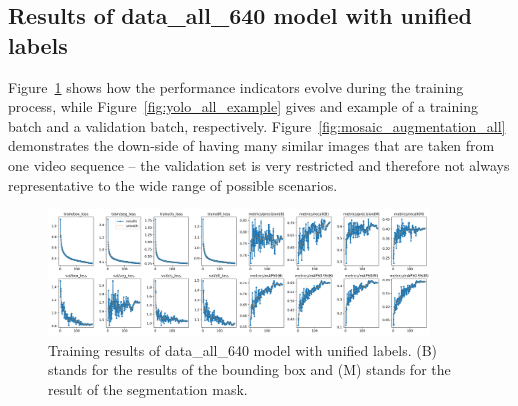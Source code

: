 \documentclass[Master,MDS,english]{BASE/twbook} %
\begin{document}
\subsection{Results of data\_all\_640 model with unified labels}

Figure~\ref{fig:training_all} shows how the performance indicators evolve during the training process, while Figure~\ref{fig:yolo_all_example} gives and example of a training batch and a validation batch, respectively.
Figure~\ref{fig:mosaic_augmentation_all} demonstrates the down-side of having many similar images that are taken from one video sequence -- the validation set is very restricted and therefore not always representative to the wide range of possible scenarios.


\begin{figure}[h]
\centering
\includegraphics[width=0.9\textwidth]{images/yolo/all/results}
\caption{Training results of data\_all\_640 model with unified labels. (B) stands for the results of the bounding box and (M) stands for the result of the segmentation mask.}
\label{fig:training_all}
\end{figure}
\end{document}
